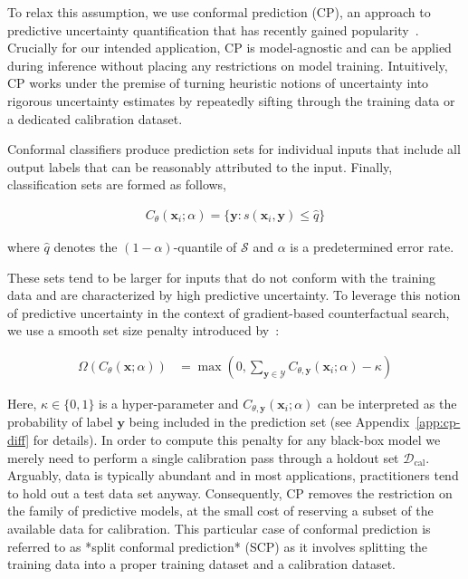 To relax this assumption, we use conformal prediction (CP), an approach to predictive uncertainty quantification that has recently gained popularity~\citep{angelopoulos2021gentle,manokhin2022awesome}. Crucially for our intended application, CP is model-agnostic and can be applied during inference without placing any restrictions on model training. Intuitively, CP works under the premise of turning heuristic notions of uncertainty into rigorous uncertainty estimates by repeatedly sifting through the training data or a dedicated calibration dataset. 

Conformal classifiers produce prediction sets for individual inputs that include all output labels that can be reasonably attributed to the input. Finally, classification sets are formed as follows,

\begin{equation}\label{eq:scp}
  \begin{aligned}
    C_{\theta}(\mathbf{x}_i;\alpha)=\{\mathbf{y}: s(\mathbf{x}_i,\mathbf{y}) \le \hat{q}\}
  \end{aligned}
\end{equation}

where $\hat{q}$ denotes the $(1-\alpha)$-quantile of $\mathcal{S}$ and $\alpha$ is a predetermined error rate.

These sets tend to be larger for inputs that do not conform with the training data and are characterized by high predictive uncertainty. To leverage this notion of predictive uncertainty in the context of gradient-based counterfactual search, we use a smooth set size penalty introduced by~\citet{stutz2022learning}:

\begin{equation}\label{eq:setsize}
  \begin{aligned}
    \Omega(C_{\theta}(\mathbf{x};\alpha))&=\max \left(0, \sum_{\mathbf{y}\in\mathcal{Y}}C_{\theta,\mathbf{y}}(\mathbf{x}_i;\alpha) - \kappa \right)
  \end{aligned}
\end{equation}

Here, $\kappa \in \{0,1\}$ is a hyper-parameter and $C_{\theta,\mathbf{y}}(\mathbf{x}_i;\alpha)$ can be interpreted as the probability of label $\mathbf{y}$ being included in the prediction set (see Appendix~\ref{app:cp-diff} for details). In order to compute this penalty for any black-box model we merely need to perform a single calibration pass through a holdout set $\mathcal{D}_{\text{cal}}$. Arguably, data is typically abundant and in most applications, practitioners tend to hold out a test data set anyway. Consequently, CP removes the restriction on the family of predictive models, at the small cost of reserving a subset of the available data for calibration. This particular case of conformal prediction is referred to as *split conformal prediction* (SCP) as it involves splitting the training data into a proper training dataset and a calibration dataset.


